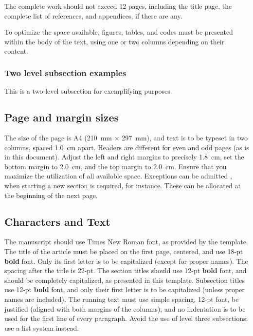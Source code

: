 \documentclass[12pt, a4paper, twoside, twocolumn]{article}
\begin{document}
The complete work should not exceed 12 pages, including the title page, the complete list of references, and appendices, if there are any.

To optimize the space available, figures, tables, and codes must be presented within the body of the text, using one or two columns depending on their content.

\subsubsection{Two level subsection examples}

This is a two-level subsection for exemplifying purposes.

\subsection{Page and margin sizes}

The size of the page is A4 (210~mm $\times$ 297~mm), and text is to be typeset in two columns, spaced 1.0~cm apart. Headers are different for even and odd pages (as is in this document). Adjust the left and right margins to precisely 1.8~cm, set the bottom margin to 2.0~cm, and the top margin to 2.0~cm. Ensure that you maximize the utilization of all available space. Exceptions can be admitted \eg, when starting a new section is required, for instance. These can be allocated at the beginning of the next page.

\subsection{Characters and Text}

The manuscript should use Times New Roman font, as provided by the template. The title of the article must be placed on the first page, centered, and use 18-pt \textbf{bold} font. Only its first letter is to be capitalized (except for proper names). The spacing after the title is 22-pt. The section titles should use  12-pt \textbf{bold} font, and should be completely capitalized, as presented in this template. Subsection titles use 12-pt \textbf{bold} font, and only their first letter is to be capitalized (unless proper names are included). The running text must use simple spacing, 12-pt font, be justified (aligned with both margins of the columns), and no indentation is to be used for the first line of every paragraph. Avoid the use of level three subsections; use a list system instead.
\end{document}
